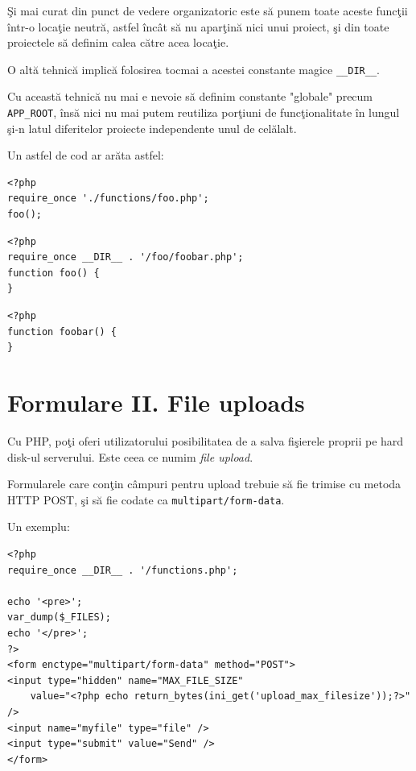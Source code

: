 Şi mai curat din punct de vedere organizatoric
este să punem toate aceste funcţii într-o
locaţie neutră, astfel încât să nu aparţină
nici unui proiect, şi din toate
proiectele să definim calea către acea
locaţie.

O altă tehnică implică folosirea tocmai
a acestei constante magice  \texttt{\_\_DIR\_\_}.

Cu această tehnică nu mai e nevoie
să definim constante "globale" precum \texttt{APP\_ROOT},
însă nici nu mai putem reutiliza porţiuni
de funcţionalitate în lungul şi-n latul
diferitelor proiecte independente unul de celălalt.

Un astfel de cod ar arăta astfel:
\begin{lstlisting}[title=index.php]
<?php
require_once './functions/foo.php';
foo();
\end{lstlisting}

\begin{lstlisting}[title=functions/foo.php]
<?php
require_once __DIR__ . '/foo/foobar.php';
function foo() {
}
\end{lstlisting}

\begin{lstlisting}[title=functions/foo/foobar.php]
<?php
function foobar() {
}
\end{lstlisting}


\section{Formulare II. File uploads}
Cu PHP, poţi oferi utilizatorului posibilitatea de a salva fişierele
proprii pe hard disk-ul serverului. Este ceea ce numim \textsl{file upload}.

Formularele care conţin câmpuri pentru upload trebuie să fie trimise
cu metoda HTTP POST, şi să fie codate ca \texttt{multipart/form-data}.

Un exemplu:
\begin{lstlisting}[title=index.php]
<?php
require_once __DIR__ . '/functions.php';

echo '<pre>';
var_dump($_FILES);
echo '</pre>';
?>
<form enctype="multipart/form-data" method="POST">
<input type="hidden" name="MAX_FILE_SIZE"
	value="<?php echo return_bytes(ini_get('upload_max_filesize'));?>" />
<input name="myfile" type="file" />
<input type="submit" value="Send" />
</form>
\end{lstlisting}

